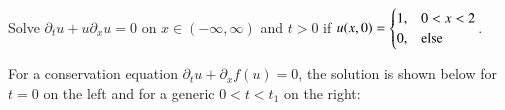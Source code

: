 \documentclass[12pt]{exam}
\newcommand{\px}{\partial_x}
\newcommand{\pt}{\partial_t}
\begin{document}
\newpage 
\begin{questions}
\begin{question}
Solve $\pt u + u \px u = 0$ on $x\in (-\infty,\infty)$ and $t>0$ if 
$u(x,0) = \begin{cases}1, & 0<x<2\\ 0, & \textnormal{else}\end{cases}$.
\end{question}
\begin{solutionorbox}[\stretch{1}]
\end{solutionorbox}

\newpage 
\begin{question}
For a conservation equation $\pt u + \px f(u) = 0$, the solution is shown below for $t=0$ on the left and for 
a generic $0<t<t_1$ on the right: 


\end{question}
\end{questions}
\end{document}
